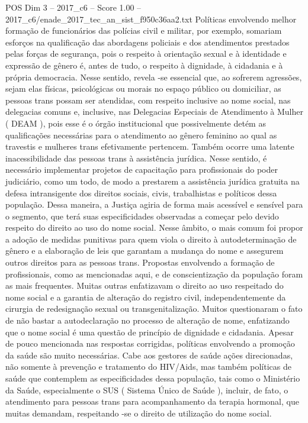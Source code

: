 \begin{textsample}{POS Dim 3 – 2017\_c6 – Score 1.00 – 2017\_c6/enade\_2017\_tec\_an\_sist\_f950c36aa2.txt}
Políticas envolvendo melhor formação de funcionários das polícias civil e militar, por exemplo, somariam esforços na qualificação das abordagens policiais e dos atendimentos prestados pelas forças de segurança, pois o respeito à orientação sexual e à identidade e expressão de gênero é, antes de tudo, o respeito à dignidade, à cidadania e à própria democracia.
Nesse sentido, revela -se essencial que, ao sofrerem agressões, sejam elas físicas, psicológicas ou morais no espaço público ou domiciliar, as pessoas trans possam ser atendidas, com respeito inclusive ao nome social, nas delegacias comuns e, inclusive, nas Delegacias Especiais de Atendimento à Mulher ( DEAM ), pois esse é o órgão institucional que possivelmente detém as qualificações necessárias para o atendimento ao gênero feminino ao qual as travestis e mulheres trans efetivamente pertencem.
Também ocorre uma latente inacessibilidade das pessoas trans à assistência jurídica.
Nesse sentido, é necessário implementar projetos de capacitação para profissionais do poder judiciário, como um todo, de modo a prestarem a assistência jurídica gratuita na defesa intransigente dos direitos sociais, civis, trabalhistas e políticos dessa população.
Dessa maneira, a Justiça agiria de forma mais acessível e sensível para o segmento, que terá suas especificidades observadas a começar pelo devido respeito do direito ao uso do nome social.
Nesse âmbito, o mais comum foi propor a adoção de medidas punitivas para quem viola o direito à autodeterminação de gênero e a elaboração de leis que garantam a mudança do nome e assegurem outros direitos para as pessoas trans.
Propostas envolvendo a formação de profissionais, como as mencionadas aqui, e de conscientização da população foram as mais frequentes.
Muitas outras enfatizavam o direito ao uso respeitado do nome social e a garantia de alteração do registro civil, independentemente da cirurgia de redesignação sexual ou transgenitalização.
Muitos questionaram o fato de não bastar a autodeclaração no processo de alteração de nome, enfatizando que o nome social é uma questão de princípio de dignidade e cidadania.
Apesar de pouco mencionada nas respostas corrigidas, políticas envolvendo a promoção da saúde são muito necessárias.
Cabe aos gestores de saúde ações direcionadas, não somente à prevenção e tratamento do HIV/Aids, mas também políticas de saúde que contemplem as especificidades dessa população, tais como o Ministério da Saúde, especialmente o SUS ( Sistema Único de Saúde ), incluir, de fato, o atendimento para pessoas trans para acompanhamento da terapia hormonal, que muitas demandam, respeitando -se o direito de utilização do nome social.

\end{textsample}
